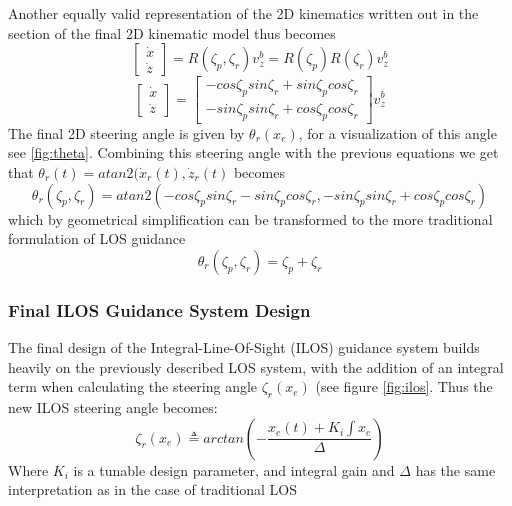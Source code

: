Another equally valid representation of the 2D kinematics written out in the section of the final 2D kinematic model thus becomes
\begin{equation}
    \begin{bmatrix}
        \dot{x} \\\dot{z}
    \end{bmatrix} = R(\zeta_p, \zeta_r)v_z^b = R(\zeta_p)R(\zeta_r)v_z^b
\end{equation}
\begin{equation}
    \begin{bmatrix}
        \dot{x} \\ \dot{z} 
    \end{bmatrix} = \begin{bmatrix}
        -cos\zeta_p sin\zeta_r + sin\zeta_p cos \zeta_r \\
        -sin\zeta_p sin \zeta_r + cos \zeta_p cos \zeta_r
    \end{bmatrix} v_z^b
\end{equation}
The final 2D steering angle is given by \(\theta_r(x_e)\), for a visualization of this angle see \ref{fig:theta}. Combining this steering angle with the previous equations we get that  \(\theta_r(t) = atan2(\dot{x}_r(t), \dot{z}_r(t)\)  becomes
\begin{equation}
    \theta_r(\zeta_p, \zeta_r) = atan2(-cos\zeta_p sin\zeta_r - sin\zeta_p cos \zeta_r, -sin\zeta_p sin \zeta_r + cos\zeta_pcos \zeta_r)
\end{equation}
which by geometrical simplification can be transformed to the more traditional formulation of LOS guidance
\begin{equation}
    \theta_r(\zeta_p, \zeta_r) = \zeta_p + \zeta_r
\end{equation}

\subsubsection{Final ILOS Guidance System Design}
The final design of the Integral-Line-Of-Sight (ILOS) guidance system builds heavily on the previously described LOS system, with the addition of an integral term when calculating the steering angle \(\zeta_r(x_e)\) (see figure \ref{fig:ilos}. Thus the new ILOS steering angle becomes:
\begin{equation}
    \zeta_{r}(x_e) \triangleq arctan(-\frac{x_e(t) +K_i\int x_e}{\Delta})
\end{equation}
Where \(K_i\) is a tunable design parameter, and integral gain and \(\Delta\) has the same interpretation as in the case of traditional LOS

